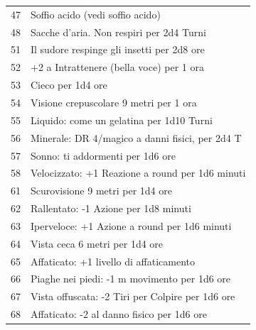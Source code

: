 \begin{multicols}{2}
\begin{tabularx}{0.50\textwidth}{lX}
47 & Soffio acido (vedi soffio acido)\\
48 & Sacche d'aria. Non respiri per 2d4 Turni\\
51 & Il sudore respinge gli insetti per 2d8 ore \\
52 & +2 a Intrattenere (bella voce) per 1 ora \\
53 & Cieco per 1d4 ore\\
54 & Visione crepuscolare 9 metri per 1 ora \\
55 & Liquido: come un gelatina per 1d10 Turni\\
56 & Minerale: DR 4/magico a danni fisici, per 2d4 T\\
57 & Sonno: ti addormenti per 1d6 ore\\
58 & Velocizzato: +1 Reazione a round per 1d6 minuti\\
61 & Scurovisione 9 metri per 1d4 ore\\
62 & Rallentato: -1 Azione per 1d8 minuti\\
63 & Iperveloce: +1 Azione a round per 1d6 minuti \\
64 & Vista ceca 6 metri per 1d4 ore \\
65 & Affaticato: +1 livello di affaticamento\\
66 & Piaghe nei piedi: -1 m movimento per 1d6 ore\\
67 & Vista offuscata: -2 Tiri per Colpire per 1d6 ore\\
68 & Affaticato: -2 al danno fisico per 1d6 ore\\


\end{tabularx}



\end{multicols}

\pagebreak

